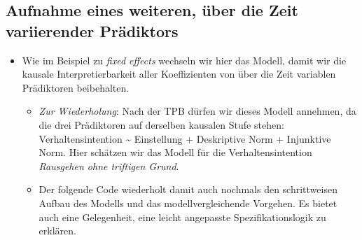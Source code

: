 \documentclass[
]{book}
\newenvironment{Shaded}{\begin{snugshade}}{\end{snugshade}}
\newcommand{\CommentTok}[1]{\textcolor[rgb]{0.56,0.35,0.01}{\textit{#1}}}
\newcommand{\DataTypeTok}[1]{\textcolor[rgb]{0.13,0.29,0.53}{#1}}
\newcommand{\DecValTok}[1]{\textcolor[rgb]{0.00,0.00,0.81}{#1}}
\newcommand{\KeywordTok}[1]{\textcolor[rgb]{0.13,0.29,0.53}{\textbf{#1}}}
\newcommand{\NormalTok}[1]{#1}
\newcommand{\OperatorTok}[1]{\textcolor[rgb]{0.81,0.36,0.00}{\textbf{#1}}}
\newcommand{\StringTok}[1]{\textcolor[rgb]{0.31,0.60,0.02}{#1}}
\providecommand{\tightlist}{%
  \setlength{\itemsep}{0pt}\setlength{\parskip}{0pt}}
\begin{document}
\hypertarget{aufnahme-eines-weiteren-uxfcber-die-zeit-variierender-pruxe4diktors}{%
\subsection*{Aufnahme eines weiteren, über die Zeit variierender Prädiktors}\label{aufnahme-eines-weiteren-uxfcber-die-zeit-variierender-pruxe4diktors}}

\begin{itemize}
\tightlist
\item
  Wie im Beispiel zu \emph{fixed effects} wechseln wir hier das Modell, damit wir die kausale Interpretierbarkeit aller Koeffizienten von über die Zeit variablen Prädiktoren beibehalten.

  \begin{itemize}
  \tightlist
  \item
    \emph{Zur Wiederholung}: Nach der TPB dürfen wir dieses Modell annehmen, da die drei Prädiktoren auf derselben kausalen Stufe stehen: Verhaltensintention \textasciitilde{} Einstellung + Deskriptive Norm + Injunktive Norm. Hier schätzen wir das Modell für die Verhaltensintention \emph{Rausgehen ohne triftigen Grund}.
  \item
    Der folgende Code wiederholt damit auch nochmals den schrittweisen Aufbau des Modells und das modellvergleichende Vorgehen. Es bietet auch eine Gelegenheit, eine leicht angepasste Spezifikationslogik zu erklären.
  \end{itemize}
\end{itemize}

\begin{Shaded}
\end{Shaded}
\end{document}
